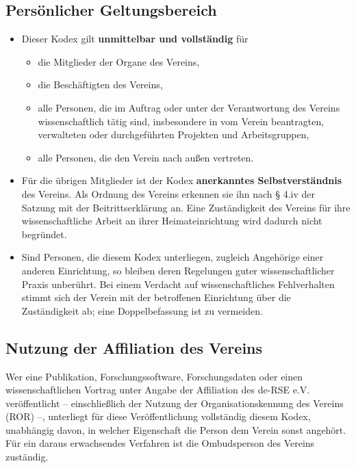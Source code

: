 \documentclass[a4paper, fontsize=11pt]{scrartcl}
\begin{document}
\subsection{Persönlicher Geltungsbereich}
\begin{itemize}
  \item Dieser Kodex gilt \textbf{unmittelbar und vollständig} für
  \begin{itemize}
    \item die Mitglieder der Organe des Vereins,
    \item die Beschäftigten des Vereins,
    \item alle Personen, die im Auftrag oder unter der Verantwortung des Vereins wissenschaftlich tätig sind, insbesondere in vom Verein beantragten, verwalteten oder durchgeführten Projekten und Arbeitsgruppen,
    \item alle Personen, die den Verein nach außen vertreten.
  \end{itemize}
  \item Für die übrigen Mitglieder ist der Kodex \textbf{anerkanntes Selbstverständnis} des Vereins. Als Ordnung des Vereins erkennen sie ihn nach § 4.iv der Satzung mit der Beitrittserklärung an. Eine Zuständigkeit des Vereins für ihre wissenschaftliche Arbeit an ihrer Heimateinrichtung wird dadurch nicht begründet.
  \item Sind Personen, die diesem Kodex unterliegen, zugleich Angehörige einer anderen Einrichtung, so bleiben deren Regelungen guter wissenschaftlicher Praxis unberührt. Bei einem Verdacht auf wissenschaftliches Fehlverhalten stimmt sich der Verein mit der betroffenen Einrichtung über die Zuständigkeit ab; eine Doppelbefassung ist zu vermeiden.
\end{itemize}

\subsection{Nutzung der Affiliation des Vereins}
Wer eine Publikation, Forschungssoftware, Forschungsdaten oder einen wissenschaftlichen Vortrag unter Angabe der Affiliation des de-RSE e.V. veröffentlicht -- einschließlich der Nutzung der Organisationskennung des Vereins (ROR) --, unterliegt für diese Veröffentlichung vollständig diesem Kodex, unabhängig davon, in welcher Eigenschaft die Person dem Verein sonst angehört. Für ein daraus erwachsendes Verfahren ist die Ombudsperson des Vereins zuständig.
\end{document}
